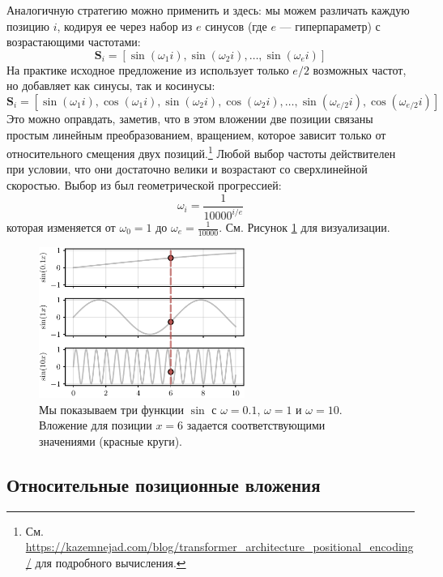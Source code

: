 Аналогичную стратегию можно применить и здесь: мы можем различать каждую позицию $i$, кодируя ее через набор из $e$ синусов (где $e$ — гиперпараметр) с возрастающими частотами:
%
$$
\mathbf{S}_i=\left[ \sin(\omega_1i), \sin(\omega_2i),\ldots,\sin(\omega_ei) \right]
$$
%
На практике исходное предложение из \cite{vaswani2017attention} использует только $e/2$ возможных частот, но добавляет как синусы, так и косинусы:
%
$$
\mathbf{S}_i=\left[ \sin(\omega_1i), \cos(\omega_1i),\sin(\omega_2i), \cos(\omega_2i),\ldots,\sin(\omega_{e/2}i), \cos(\omega_{e/2}i) \right]
$$
%
Это можно оправдать, заметив, что в этом вложении две позиции связаны простым линейным преобразованием, вращением, которое зависит только от относительного смещения двух позиций.\footnote{См. \url{https://kazemnejad.com/blog/transformer_architecture_positional_encoding/} для подробного вычисления.} Любой выбор частоты действителен при условии, что они достаточно велики и возрастают со сверхлинейной скоростью. Выбор из \cite{vaswani2017attention} был геометрической прогрессией:
%
$$
\omega_i=\frac{1}{10000^{i/e}}
$$
%
которая изменяется от $\omega_0=1$ до $\omega_e=\frac{1}{10000}$. См. Рисунок \ref{fig:positional_embeddings_plot} для визуализации.

\begin{figure}
    \centering
    \hspace{1em}\includegraphics[width=0.6\textwidth]{images/positional_embeddings_plot}
    \caption{Мы показываем три функции $\sin$ с $\omega=0.1$, $\omega=1$ и $\omega=10$. Вложение для позиции $x=6$ задается соответствующими значениями (красные круги).}
    \label{fig:positional_embeddings_plot}
\end{figure}

\subsection{Относительные позиционные вложения}

